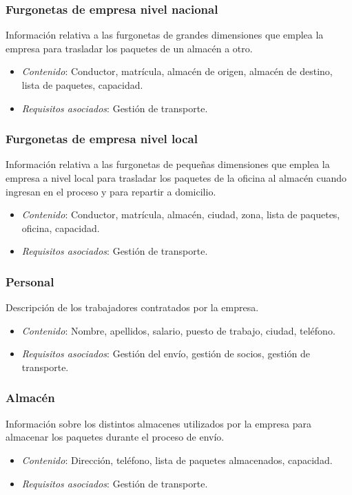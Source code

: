 \subsubsection{Furgonetas de empresa nivel nacional}
	Información relativa a las furgonetas de grandes dimensiones que emplea la empresa para trasladar los paquetes de un almacén a otro.
\begin{itemize}
	\item \textit{Contenido}: Conductor, matrícula, almacén de origen, almacén de destino, lista de paquetes, capacidad.
	\item \textit{Requisitos asociados}: Gestión de transporte.\\
\end{itemize}

\subsubsection{Furgonetas de empresa nivel local}
	Información relativa a las furgonetas de pequeñas dimensiones que emplea la empresa a nivel local para trasladar los paquetes de la oficina al almacén cuando ingresan en el proceso y para repartir a domicilio. 
\begin{itemize}
	\item \textit{Contenido}: Conductor, matrícula, almacén, ciudad, zona, lista de paquetes, oficina, capacidad.
	\item \textit{Requisitos asociados}: Gestión de transporte. \\
\end{itemize}


\subsubsection{Personal}
	Descripción de los trabajadores contratados por la empresa.
\begin{itemize}
	\item \textit{Contenido}: Nombre, apellidos, salario, puesto de trabajo, ciudad, teléfono.
	
	\item \textit{Requisitos asociados}: Gestión del envío, gestión de socios, gestión de transporte. \\
\end{itemize}


\subsubsection{Almacén}
Información sobre los distintos almacenes utilizados por la empresa para almacenar los paquetes durante el proceso de envío.
\begin{itemize}
	\item \textit{Contenido}: Dirección, teléfono, lista de paquetes almacenados, capacidad.
	
	\item \textit{Requisitos asociados}: Gestión de transporte. \\
\end{itemize}

